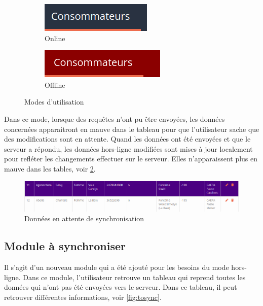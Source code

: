 \documentclass{EPL-master-thesis-covers-FR}
\begin{document}
				\begin{figure}[H]
					\label{fig:mode}
					\centering
					\begin{subfigure}[b]{0.3\textwidth}
  						\includegraphics[width=1\linewidth]{images/consumer_blue}
  						\caption{Online}
					\end{subfigure}%
					\begin{subfigure}[b]{0.333\textwidth}
  						\includegraphics[width=1\linewidth]{images/consumer_red}
  						\caption{Offline}
					\end{subfigure}
					\caption{Modes d'utilisation}
					\label{fig:test}
				\end{figure}
			
				Dans ce mode, lorsque des requêtes n'ont pu être envoyées, les données concernées apparaitront en mauve dans le tableau pour que l'utilisateur sache que des modifications sont en attente. Quand les données ont été envoyées et que le serveur a répondu, les données hors-ligne modifiées sont mises à jour localement pour refléter les changements effectuer sur le serveur. Elles n'apparaissent plus en mauve dans les tables, voir \ref{fig:purple}. 
				
				\begin{figure}[H]
					\centering
					\includegraphics[width=1\textwidth]{images/purple}
					\caption{Données en attente de synchronisation}
					\label{fig:purple}
				\end{figure}
				
							
			\subsection*{Module à synchroniser}
				Il s'agit d'un nouveau module qui a été ajouté pour les besoins du mode hors-ligne. Dans ce module, l'utilisateur retrouve un tableau qui reprend toutes les données qui n'ont pas été envoyées vers le serveur. Dans ce tableau, il peut retrouver différentes informations, voir \ref{fig:tosync}.
				
\end{document}
